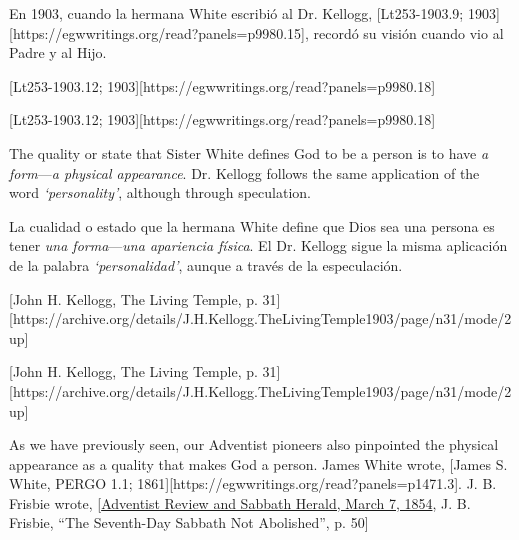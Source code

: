 En 1903, cuando la hermana White escribió al Dr. Kellogg, [Lt253-1903.9; 1903][https://egwwritings.org/read?panels=p9980.15], recordó su visión cuando vio al Padre y al Hijo.


[Lt253-1903.12; 1903][https://egwwritings.org/read?panels=p9980.18]


[Lt253-1903.12; 1903][https://egwwritings.org/read?panels=p9980.18]


The quality or state that Sister White defines God to be a person is to have \textit{a form}—\textit{a physical appearance}. Dr. Kellogg follows the same application of the word \textit{‘personality’}, although through speculation.


La cualidad o estado que la hermana White define que Dios sea una persona es tener \textit{una forma}—\textit{una apariencia física}. El Dr. Kellogg sigue la misma aplicación de la palabra \textit{‘personalidad’}, aunque a través de la especulación.


[John H. Kellogg, The Living Temple, p. 31][https://archive.org/details/J.H.Kellogg.TheLivingTemple1903/page/n31/mode/2up]


[John H. Kellogg, The Living Temple, p. 31][https://archive.org/details/J.H.Kellogg.TheLivingTemple1903/page/n31/mode/2up]


As we have previously seen, our Adventist pioneers also pinpointed the physical appearance as a quality that makes God a person. James White wrote, [James S. White, PERGO 1.1; 1861][https://egwwritings.org/read?panels=p1471.3]. J. B. Frisbie wrote, [\href{https://documents.adventistarchives.org/Periodicals/RH/RH18540307-V05-07.pdf}{Adventist Review and Sabbath Herald, March 7, 1854}, J. B. Frisbie, “The Seventh-Day Sabbath Not Abolished”, p. 50]


